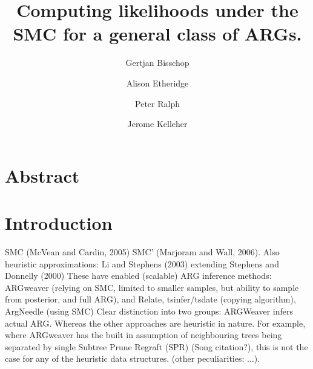 \documentclass{article}
\begin{document}
\linenumbers
\title{Computing likelihoods under the SMC for a general class of ARGs.}

\author[1, $\dagger$]{Gertjan Bisschop}

\author[2]{Alison Etheridge}
\author[3]{Peter Ralph}

\author[1]{Jerome Kelleher}

\maketitle


\section{Abstract}

\section{Introduction}



SMC (McVean and Cardin, 2005) SMC' (Marjoram and Wall, 2006).
Also heuristic approximations: Li and Stephens (2003) extending Stephens and Donnelly 
(2000)
These have enabled (scalable) ARG inference methods: ARGweaver (relying on SMC, limited 
to smaller samples, but ability to sample from posterior, and full ARG), and Relate, 
tsinfer/tsdate (copying algorithm), ArgNeedle (using SMC) 
Clear distinction into two groups: ARGWeaver infers actual ARG.
Whereas the other approaches are heuristic in nature. For example, where ARGweaver has 
the built in assumption of neighbouring trees being separated by single Subtree Prune 
Regraft (SPR) (Song citation?), this is not the case for any of the heuristic data 
structures. (other peculiarities: ...).

\end{document}
